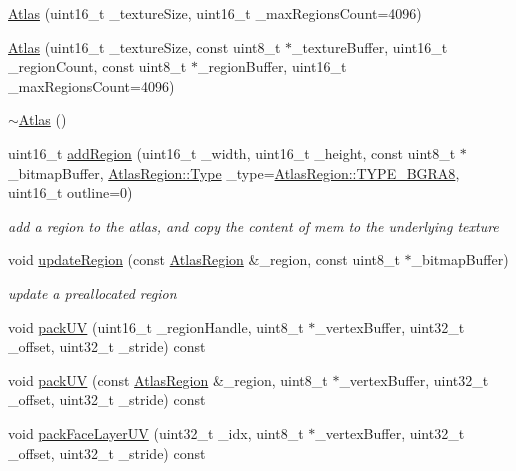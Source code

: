 \begin{DoxyCompactItemize}
\item 
\hyperlink{class_atlas_a226154ccd3bfd64dcc8c119377e15924}{Atlas} (uint16\+\_\+t \+\_\+texture\+Size, uint16\+\_\+t \+\_\+max\+Regions\+Count=4096)
\item 
\hyperlink{class_atlas_a108e8c56ea6d84501971cac219b522ca}{Atlas} (uint16\+\_\+t \+\_\+texture\+Size, const uint8\+\_\+t $\ast$\+\_\+texture\+Buffer, uint16\+\_\+t \+\_\+region\+Count, const uint8\+\_\+t $\ast$\+\_\+region\+Buffer, uint16\+\_\+t \+\_\+max\+Regions\+Count=4096)
\item 
\hyperlink{class_atlas_aa48ba7a82ee4f67e84184feadf1afeda}{$\sim$\+Atlas} ()
\item 
uint16\+\_\+t \hyperlink{class_atlas_a4b62a1b4eaf492865cdd72db69e4ee5a}{add\+Region} (uint16\+\_\+t \+\_\+width, uint16\+\_\+t \+\_\+height, const uint8\+\_\+t $\ast$\+\_\+bitmap\+Buffer, \hyperlink{struct_atlas_region_a51d027756a617938bf45be832663e2c2}{Atlas\+Region\+::\+Type} \+\_\+type=\hyperlink{struct_atlas_region_a51d027756a617938bf45be832663e2c2a3010705c5f10ae5b40dee6de2fb1bb63}{Atlas\+Region\+::\+T\+Y\+P\+E\+\_\+\+B\+G\+R\+A8}, uint16\+\_\+t outline=0)
\begin{DoxyCompactList}\small\item\em add a region to the atlas, and copy the content of mem to the underlying texture \end{DoxyCompactList}\item 
void \hyperlink{class_atlas_ab6e1cc8a4f6c422c1bf2fa9f978a7235}{update\+Region} (const \hyperlink{struct_atlas_region}{Atlas\+Region} \&\+\_\+region, const uint8\+\_\+t $\ast$\+\_\+bitmap\+Buffer)
\begin{DoxyCompactList}\small\item\em update a preallocated region \end{DoxyCompactList}\item 
void \hyperlink{class_atlas_a893420827f5ef1ab1143a6fb238df9a6}{pack\+U\+V} (uint16\+\_\+t \+\_\+region\+Handle, uint8\+\_\+t $\ast$\+\_\+vertex\+Buffer, uint32\+\_\+t \+\_\+offset, uint32\+\_\+t \+\_\+stride) const 
\item 
void \hyperlink{class_atlas_ab17f538673ac6253dd4c95d5bc5d1965}{pack\+U\+V} (const \hyperlink{struct_atlas_region}{Atlas\+Region} \&\+\_\+region, uint8\+\_\+t $\ast$\+\_\+vertex\+Buffer, uint32\+\_\+t \+\_\+offset, uint32\+\_\+t \+\_\+stride) const 
\item 
void \hyperlink{class_atlas_a970b187840588b511f713fe8a8e0d919}{pack\+Face\+Layer\+U\+V} (uint32\+\_\+t \+\_\+idx, uint8\+\_\+t $\ast$\+\_\+vertex\+Buffer, uint32\+\_\+t \+\_\+offset, uint32\+\_\+t \+\_\+stride) const 

\end{DoxyCompactItemize}
